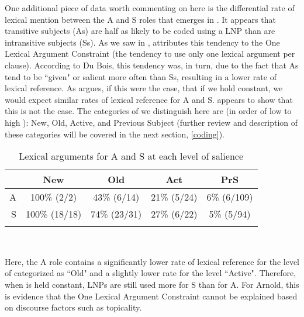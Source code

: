 One additional piece of data worth commenting on here is the differential rate of lexical mention between the A and S roles that emerges in . It appears that transitive subjects (As) are half as likely to be coded using a LNP than are intransitive subjects (Ss). As we saw in , \citet{dubois1987} attributes this tendency to the One Lexical Argument Constraint (the tendency to use only one lexical argument per clause). According to Du Bois, this tendency was, in turn, due to the fact that As tend to be ``given" or salient more often than Ss, resulting in a lower rate of lexical reference. As \citet[237]{arnold2003} argues, if this were the case, that if we hold  constant, we would expect similar rates of lexical reference for A and S.  appears to show that this is not the case. The categories of  we distinguish here are (in order of low to high ): New, Old, Active, and Previous Subject (further review and description of these categories will be covered in the next section, \ref{coding}). 

\begin{table} 

\caption{{Lexical arguments for A and S at each level of salience}}
\begin{tabular}{ r  c  c  c  c }
\lsptoprule
 & New & Old & Act & PrS \\

\midrule
 A & 100{\%} (2/2) & 43{\%} (6/14) & 21{\%} (5/24)  & 6{\%} (6/109) \\

 
S & 100{\%} (18/18) & 74{\%} (23/31) & 27{\%} (6/22) & 5{\%} (5/94) \\

\lspbottomrule
\end{tabular}\\
\label{ASsalience}

\end{table}
Here, the A role contains a significantly lower rate of lexical reference for the level of  categorized as ``Old" and a slightly lower rate for the level ``Active". Therefore, when  is held constant, LNPs are still used more for S than for A. For Arnold, this is evidence that the One Lexical Argument Constraint cannot be explained based on discourse factors such as topicality.

